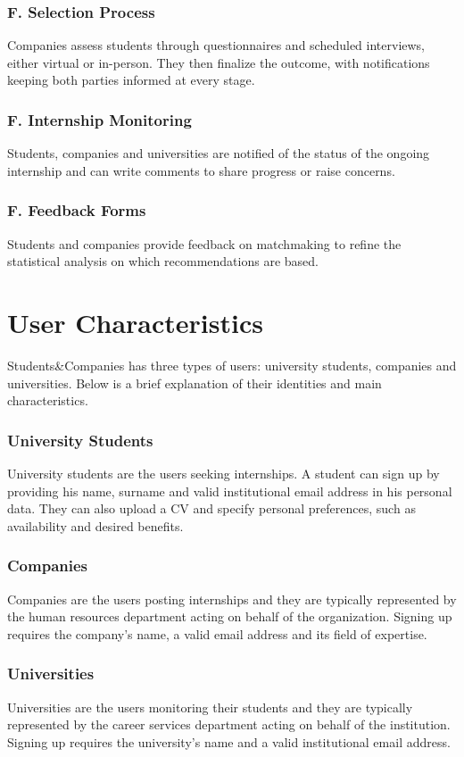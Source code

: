 \subsubsection*{F\fc. Selection Process}
Companies assess students through questionnaires and scheduled interviews, either virtual or in-person.
They then finalize the outcome, with notifications keeping both parties informed at every stage.

\subsubsection*{F\fc. Internship Monitoring}
Students, companies and universities are notified of the status of the ongoing internship and can write comments to share progress or raise concerns.

\subsubsection*{F\fc. Feedback Forms}
Students and companies provide feedback on matchmaking to refine the statistical analysis on which recommendations are based.

\section{User Characteristics}
Students\&Companies has three types of users: university students, companies and universities.
Below is a brief explanation of their identities and main characteristics.

\subsubsection{University Students}
University students are the users seeking internships.
A student can sign up by providing his name, surname and valid institutional email address in his personal data.
They can also upload a CV and specify personal preferences, such as availability and desired benefits.

\subsubsection{Companies}
Companies are the users posting internships and they are typically represented by the human resources department acting on behalf of the organization.
Signing up requires the company's name, a valid email address and its field of expertise.

\subsubsection{Universities}
Universities are the users monitoring their students and they are typically represented by the career services department acting on behalf of the institution.
Signing up requires the university's name and a valid institutional email address.

